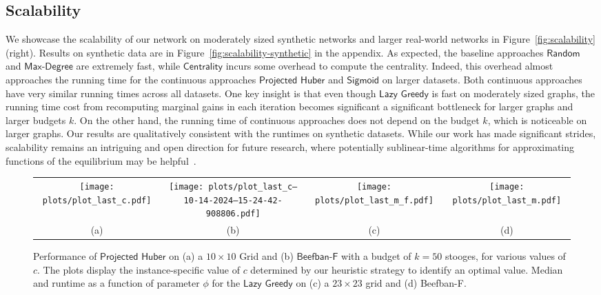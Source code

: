 \subsection{Scalability}

We showcase the scalability of our network
on moderately sized synthetic networks and
larger real-world networks in
Figure~\ref{fig:scalability} (right).
Results on synthetic data
are in Figure~\ref{fig:scalability-synthetic}
in the appendix.
As expected, the baseline approaches
$\textsf{Random}$ and $\textsf{Max-Degree}$
are extremely fast, while $\textsf{Centrality}$
incurs some overhead to compute the centrality.
Indeed, this overhead almost approaches
the running time for the continuous approaches
$\textsf{Projected Huber}$ and $\textsf{Sigmoid}$
on larger datasets.
Both continuous approaches have very
similar running times across all datasets.
One key insight is that even though
$\textsf{Lazy Greedy}$ is fast on moderately
sized graphs, the running time cost from
recomputing marginal gains in each iteration
becomes significant a significant
bottleneck for larger graphs and
larger budgets $k$.
On the other hand, the running time
of continuous approaches does not
depend on the budget $k$, which is
noticeable on larger graphs. Our results are qualitatively consistent with the runtimes on synthetic datasets. While our work has made significant strides, scalability remains an intriguing and open direction for future research, where potentially sublinear-time algorithms for approximating functions of the equilibrium  may be helpful~\cite{neumann2024sublinear}.



\begin{figure*}[htbp]
    \centering
    \small
    \setlength{\tabcolsep}{0pt}
    \begin{tabular}{cccc}
        \texttt{[image: plots/plot\_last\_c.pdf]} & 
        \texttt{[image: plots/plot\_last\_c--10-14-2024--15-24-42-908806.pdf]}  & 
        \texttt{[image: plots/plot\_last\_m\_f.pdf]} &
        \texttt{[image: plots/plot\_last\_m.pdf]} \\[-3pt]
    (a) & (b) & (c) & (d)
    \end{tabular}
    \vspace{-5pt}
    \caption{ \label{fig:ablation-c} Performance of $\textsf{Projected Huber}$ on   (a) a $10\times 10$ \textsf{Grid} and (b)  $\textsf{Beefban-F}$ with a budget of $k=50$ stooges, for various values of $c$. The plots display the instance-specific value of $c$ determined by our heuristic strategy to identify an optimal value. Median and runtime as a function of parameter $\phi$  for the $\textsf{Lazy Greedy}$ on (c) a $23 \times 23$ grid and (d) \textsf{Beefban-F}. 
    }
\end{figure*}

